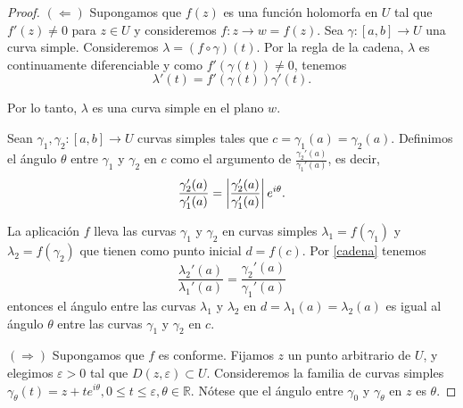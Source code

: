 \begin{proof}
    $(\Leftarrow)$ Supongamos que $f(z)$ es una función holomorfa en $U$ tal que $f'(z) \not = 0$ para $z \in U$ y consideremos $f:z \rightarrow w=f(z)$. Sea $\gamma: [a,b] \rightarrow U$ una curva simple. Consideremos $\lambda = (f \circ  \gamma)(t)$. Por la regla de la cadena, $\lambda$ es continuamente diferenciable y como $f'(\gamma(t)) \not = 0$, tenemos
    \begin{equation}
        \label{cadena}
        \lambda'(t) = f'(\gamma(t))\gamma'(t).
    \end{equation}

    Por lo tanto, $\lambda$ es una curva simple en el plano $w$.

    Sean $\gamma_1, \gamma_2: [a,b] \rightarrow U$ curvas simples tales que $c=\gamma_1(a) = \gamma_2(a)$. Definimos el ángulo $\theta$ entre $\gamma_1$ y $\gamma_2$ en $c$ como el argumento de $\frac{\gamma_2'(a)}{\gamma_1'(a)}$, es decir,
    \begin{equation*}
        \dfrac{\gamma_2'(a)}{\gamma_1'(a)} = \left\lvert\dfrac{\gamma_2'(a)}{\gamma_1'(a)}\right\rvert e^{i\theta}.
    \end{equation*}

    La aplicación $f$ lleva las curvas $\gamma_1$ y $\gamma_2$ en curvas simples $\lambda_1=f(\gamma_1)$ y $\lambda_2=f(\gamma_2)$ que tienen como punto inicial $d=f(c)$. Por \ref{cadena} tenemos
    \begin{equation*}
        \dfrac{\lambda_2'(a)}{\lambda_1'(a)} = \dfrac{\gamma_2'(a)}{\gamma_1'(a)}
    \end{equation*}
    entonces el ángulo entre las curvas $\lambda_1$ y $\lambda_2$ en $d = \lambda_1(a) = \lambda_2(a)$ es igual al ángulo $\theta$ entre las curvas $\gamma_1$ y $\gamma_2$ en $c$. \\ \par

    $(\Rightarrow)$ Supongamos que $f$ es conforme. Fijamos $z$ un punto arbitrario de $U$, y elegimos $\varepsilon > 0$ tal que $D(z, \varepsilon) \subset U$. Consideremos la familia de curvas simples $\gamma_{\theta}(t) = z + te^{i \theta}, 0 \leq t \leq \varepsilon, \theta \in \mathbb{R}$. Nótese que el ángulo entre $\gamma_0$ y $\gamma_{\theta}$ en $z$ es $\theta$.



\end{proof}
